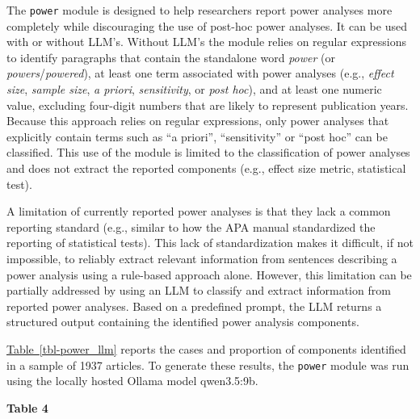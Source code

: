 \documentclass[
  letterpaper,
  12pt]{article}
\newcommand{\apafloattitle}[1]{%
  {\par\noindent\bfseries #1\par\nopagebreak}}
\newlength{\apatablekeepdepth}
\newcommand{\apatablekeep}{%
  \par\setlength{\apatablekeepdepth}{\prevdepth}%
  \setbox\apatablekeepbox\vbox\bgroup\prevdepth\apatablekeepdepth}
\newlength{\apatablenotegap}
\begin{document}
The \texttt{power} module is designed to help researchers report power
analyses more completely while discouraging the use of post-hoc power
analyses. It can be used with or without LLM's. Without LLM's the module
relies on regular expressions to identify paragraphs that contain the
standalone word \emph{power} (or \emph{powers}/\emph{powered}), at least
one term associated with power analyses (e.g., \emph{effect size},
\emph{sample size}, \emph{a priori}, \emph{sensitivity}, or \emph{post
hoc}), and at least one numeric value, excluding four-digit numbers that
are likely to represent publication years. Because this approach relies
on regular expressions, only power analyses that explicitly contain
terms such as ``a priori'', ``sensitivity'' or ``post hoc'' can be
classified. This use of the module is limited to the classification of
power analyses and does not extract the reported components (e.g.,
effect size metric, statistical test).

A limitation of currently reported power analyses is that they lack a
common reporting standard (e.g., similar to how the APA manual
standardized the reporting of statistical tests). This lack of
standardization makes it difficult, if not impossible, to reliably
extract relevant information from sentences describing a power analysis
using a rule-based approach alone. However, this limitation can be
partially addressed by using an LLM to classify and extract information
from reported power analyses. Based on a predefined prompt, the LLM
returns a structured output containing the identified power analysis
components.

\hyperref[tbl-power_llm]{Table~\ref*{tbl-power_llm}} reports the cases
and proportion of components identified in a sample of 1937 articles. To
generate these results, the \texttt{power} module was run using the
locally hosted Ollama model qwen3.5:9b.

\par\addvspace{\baselineskip}\begingroup

\setlength{\LTleft}{0pt}\setlength{\LTright}{\fill}\setlength{\LTpost}{0pt}\setlength{\apatablenotegap}{-0.5pt}

\setlength{\LTpre}{16pt}

\apatablekeep

\setcounter{table}{3}

%
\makeatletter\def\@currentlabel{4}\makeatother%
\label{tbl-power_llm}

\apafloattitle{Table 4}
\end{document}
